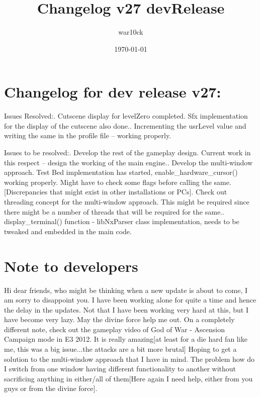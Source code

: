 \documentclass[a4paper]{article}
\begin{document}
\title{Changelog v27 devRelease}	%
\author{war10ck}	%
\date{\today}
\maketitle

\section{Changelog for dev release v27:}
Issues Resolved:. Cutscene display for levelZero completed. Sfx implementation for the display of the cutscene also done.. Incrementing the usrLevel value and writing the same in the profile file -- working properly.\newline

Issues to be resolved:. Develop the rest of the gameplay design. Current work in this respect -- design the working of the main engine.. Develop the multi-window approach. Test Bed implementation has started, enable\_hardware\_cursor() working properly. Might have to check some flags before calling the same.[Discrepancies that might exist in other installations or PCs]. Check out threading concept for the multi-window approach. This might be required since there might be a number
of threads that will be required for the same.. display\_terminal() function -\> libNxParser class implementation, needs to be tweaked and embedded in the main code.\newline

\section{Note to developers}
Hi dear friends, who might be thinking when a new update is about to come, I am sorry to disappoint you. I have been working alone for quite a time and hence the delay in the updates. Not that I have been working very hard at this, but I have become very lazy. May the divine force help me out.\newline
On a completely different note, check out the gameplay video of God of War - Ascension Campaign mode in E3 2012. It is really amazing[at least for a die hard fan like me, this was a big issue...the attacks are a bit more brutal]\newline
Hoping to get a solution to the multi-window approach that I have in mind. The problem how do I switch from one window having different functionality to another without sacrificing anything in either/all of them[Here again I need help, either from you guys or from the divine force].\newline

\pagebreak
\end{document}
